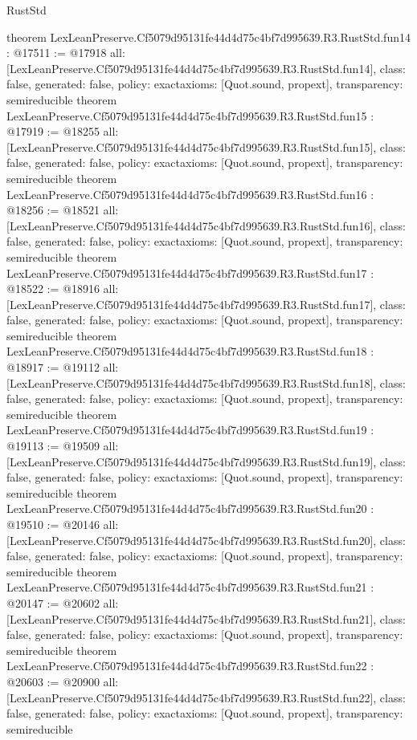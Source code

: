\begin{lexlean}{RustStd}
\begin{coremodule}
{}
theorem LexLeanPreserve.Cf5079d95131fe44d4d75c4bf7d995639.R3.RustStd.fun14 : @17511 := @17918 {
  all: [LexLeanPreserve.Cf5079d95131fe44d4d75c4bf7d995639.R3.RustStd.fun14],
  class: false,
  generated: false,
  policy: exact{axioms: [Quot.sound, propext]},
  transparency: semireducible
}
theorem LexLeanPreserve.Cf5079d95131fe44d4d75c4bf7d995639.R3.RustStd.fun15 : @17919 := @18255 {
  all: [LexLeanPreserve.Cf5079d95131fe44d4d75c4bf7d995639.R3.RustStd.fun15],
  class: false,
  generated: false,
  policy: exact{axioms: [Quot.sound, propext]},
  transparency: semireducible
}
theorem LexLeanPreserve.Cf5079d95131fe44d4d75c4bf7d995639.R3.RustStd.fun16 : @18256 := @18521 {
  all: [LexLeanPreserve.Cf5079d95131fe44d4d75c4bf7d995639.R3.RustStd.fun16],
  class: false,
  generated: false,
  policy: exact{axioms: [Quot.sound, propext]},
  transparency: semireducible
}
theorem LexLeanPreserve.Cf5079d95131fe44d4d75c4bf7d995639.R3.RustStd.fun17 : @18522 := @18916 {
  all: [LexLeanPreserve.Cf5079d95131fe44d4d75c4bf7d995639.R3.RustStd.fun17],
  class: false,
  generated: false,
  policy: exact{axioms: [Quot.sound, propext]},
  transparency: semireducible
}
theorem LexLeanPreserve.Cf5079d95131fe44d4d75c4bf7d995639.R3.RustStd.fun18 : @18917 := @19112 {
  all: [LexLeanPreserve.Cf5079d95131fe44d4d75c4bf7d995639.R3.RustStd.fun18],
  class: false,
  generated: false,
  policy: exact{axioms: [Quot.sound, propext]},
  transparency: semireducible
}
theorem LexLeanPreserve.Cf5079d95131fe44d4d75c4bf7d995639.R3.RustStd.fun19 : @19113 := @19509 {
  all: [LexLeanPreserve.Cf5079d95131fe44d4d75c4bf7d995639.R3.RustStd.fun19],
  class: false,
  generated: false,
  policy: exact{axioms: [Quot.sound, propext]},
  transparency: semireducible
}
theorem LexLeanPreserve.Cf5079d95131fe44d4d75c4bf7d995639.R3.RustStd.fun20 : @19510 := @20146 {
  all: [LexLeanPreserve.Cf5079d95131fe44d4d75c4bf7d995639.R3.RustStd.fun20],
  class: false,
  generated: false,
  policy: exact{axioms: [Quot.sound, propext]},
  transparency: semireducible
}
theorem LexLeanPreserve.Cf5079d95131fe44d4d75c4bf7d995639.R3.RustStd.fun21 : @20147 := @20602 {
  all: [LexLeanPreserve.Cf5079d95131fe44d4d75c4bf7d995639.R3.RustStd.fun21],
  class: false,
  generated: false,
  policy: exact{axioms: [Quot.sound, propext]},
  transparency: semireducible
}
theorem LexLeanPreserve.Cf5079d95131fe44d4d75c4bf7d995639.R3.RustStd.fun22 : @20603 := @20900 {
  all: [LexLeanPreserve.Cf5079d95131fe44d4d75c4bf7d995639.R3.RustStd.fun22],
  class: false,
  generated: false,
  policy: exact{axioms: [Quot.sound, propext]},
  transparency: semireducible
}
\end{coremodule}
\end{lexlean}
